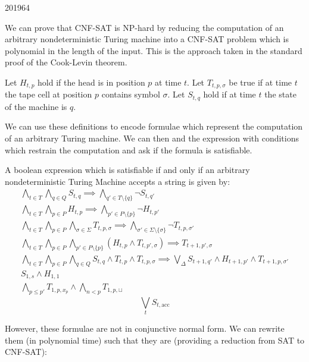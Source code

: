 \documentclass[10pt,\jkfside,a4paper]{article}
\begin{document}
\begin{examquestion}{2019}{6}{4}
\begin{enumerate}[label=(\alph*)]
We can prove that CNF-SAT is NP-hard by reducing the computation of an
arbitrary nondeterministic Turing machine into a CNF-SAT problem which is
polynomial in the length of the input. This is the approach taken in the
standard proof of the Cook-Levin theorem.

Let $H_{t, p}$ hold if the head is in position $p$ at time $t$. Let
$T_{t, p, \sigma}$ be true if at time $t$ the tape cell at position $p$
contains symbol $\sigma$. Let $S_{t, q}$ hold if at time $t$ the state of
the machine is $q$.

We can use these definitions to encode formulae which represent the
computation of an arbitrary Turing machine. We can then and the expression
with conditions which restrain the computation and ask if the formula is
satisfiable.

A boolean expression which is satisfiable if and only if an arbitrary
nondeterministic Turing Machine accepts a string is given by:
\begin{gather*}
\bigwedge_{t \in T} \bigwedge_{q \in Q} S_{t, q} \implies \bigwedge_{q' \in T
\setminus \{q\}} \neg S_{t, q'}\\
\bigwedge_{t \in T} \bigwedge_{p \in P} H_{t, p} \implies \bigwedge_{p' \in P
\setminus \{p\}} \neg H_{t, p'}\\
\bigwedge_{t \in T} \bigwedge_{p \in P} \bigwedge_{\sigma \in \Sigma} T_{t,
p, \sigma} \implies \bigwedge_{\sigma' \in \Sigma \setminus \{\sigma\}} \neg
T_{t, p, \sigma'}\\
\bigwedge_{t \in T} \bigwedge_{p \in P} \bigwedge_{p' \in P\setminus\{p\}}
\left( H_{t, p} \wedge T_{t, p', \sigma} \right) \implies T_{t + 1, p',
\sigma}\\
\bigwedge_{t \in T} \bigwedge_{p \in P} \bigwedge_{q \in Q}
S_{t, q} \wedge T_{t, p} \wedge T_{t, p, \sigma} \implies
\bigvee_{\Delta} S_{t+1, q'} \wedge H_{t+1, p'} \wedge T_{t+1, p, \sigma'} \\
S_{1, s} \wedge H_{1, 1}\\
\bigwedge_{p \le p'} T_{1, p, x_p} \wedge \bigwedge_{n < p} T_{1, p, \sqcup}
\end{gather*}
\[
\bigvee_{t} S_{t, \text{acc}}
\]

However, these formulae are not in conjunctive normal form. We can rewrite
them (in polynomial time) such that they are (providing a reduction from SAT
to CNF-SAT):


\end{enumerate}
\end{examquestion}
\end{document}
